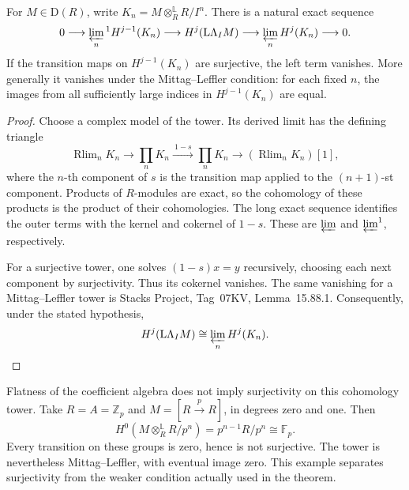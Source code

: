 \begin{theorem}
\label{v4-arith:w5-d:der-compl:thm:main}
For \(M\in\mathrm D(R)\), write
\(K_n=M\otimes_R^{\mathbb L}R/I^n\).
There is a natural exact sequence
\begin{equation}
\label{v4-arith:w5-d:eq:der-compl-main}
 0\longrightarrow\varprojlim_n{}^1 H^{j-1}(K_n)
 \longrightarrow H^j(\mathrm L\Lambda_I M)
 \longrightarrow\varprojlim_n H^j(K_n)
 \longrightarrow0.
\end{equation}
If the transition maps on \(H^{j-1}(K_n)\) are surjective,
the left term vanishes.
More generally it vanishes under the Mittag--Leffler condition:
for each fixed \(n\), the images from all sufficiently large
indices in \(H^{j-1}(K_n)\) are equal.
\end{theorem}
\begin{proof}
Choose a complex model of the tower. Its derived limit has
the defining triangle
\begin{equation}
\label{v4-arith:w5-d:eq:der-compl-ss}
 \operatorname{Rlim}_n K_n\longrightarrow\prod_nK_n
 \xrightarrow{\ 1-s\ }\prod_nK_n
 \longrightarrow(\operatorname{Rlim}_nK_n)[1],
\end{equation}
where the \(n\)-th component of \(s\) is the transition
map applied to the \((n+1)\)-st component.
Products of \(R\)-modules are exact, so the cohomology of
these products is the product of their cohomologies.
The long exact sequence identifies the outer terms with
the kernel and cokernel of \(1-s\).
These are \(\varprojlim\) and \(\varprojlim^1\), respectively.

For a surjective tower, one solves \((1-s)x=y\) recursively,
choosing each next component by surjectivity.
Thus its cokernel vanishes. The same vanishing for a
Mittag--Leffler tower is Stacks Project, Tag~07KV, Lemma~15.88.1.
Consequently, under the stated hypothesis,
\begin{equation}
\label{v4-arith:w5-d:eq:collapse}
 H^j(\mathrm L\Lambda_I M)\cong\varprojlim_nH^j(K_n).
\end{equation}
\end{proof}

Flatness of the coefficient algebra does not imply surjectivity
on this cohomology tower. Take \(R=A=\mathbb Z_p\) and
\(M=[R\xrightarrow{p}R]\), in degrees zero and one.
Then
\[
 H^0(M\otimes_R^{\mathbb L}R/p^n)
   =p^{n-1}R/p^n\cong\mathbb F_p.
\]
Every transition on these groups is zero, hence is not surjective.
The tower is nevertheless Mittag--Leffler, with eventual image zero.
This example separates surjectivity from the weaker condition
actually used in the theorem.


